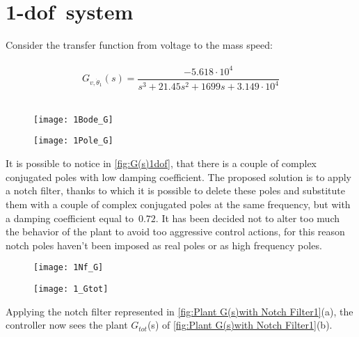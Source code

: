 
\section{\acrshort{1-dof}\ system}
Consider the transfer function from voltage to the mass speed:\\
\\
\[	
G_{v, \dot \theta_1}(s)=
\frac{-5.618 \cdot 10^{4}}{{s^3 + 21.45 s^{2}}+1699 s+3.149 \cdot 10^{4}}
\]
\\

\begin{figure*}[h]
	\centering
	\begin{subfigure}{0.4\columnwidth}
		\texttt{[image: 1Bode\_G]}
	\end{subfigure}
	\begin{subfigure}{0.4\columnwidth}
		\texttt{[image: 1Pole\_G]}
	\end{subfigure}
	\caption{$G_{v, \dot \theta_1}(s)$}
	\label{fig:G(s)1dof}
\end{figure*}

It is possible to notice in \cref{fig:G(s)1dof}, that there is a couple of complex conjugated poles with low damping coefficient. The proposed solution is to apply a notch filter, thanks to which it is possible to delete these poles and substitute them with a couple of complex conjugated poles at the same frequency, but with a damping coefficient equal to~$0.72$. It has been decided not to alter too much the behavior of the plant to avoid too aggressive control actions, for this reason notch poles haven't been imposed as real poles or as high frequency poles.

\begin{figure*}[h]
	\centering
	\begin{subfigure}{0.35\columnwidth}
		\texttt{[image: 1Nf\_G]}
	\end{subfigure}
	\begin{subfigure}{0.35\columnwidth}
		\texttt{[image: 1\_Gtot]}
	\end{subfigure}
	\caption{Plant $G(s)$ with Notch Filter $N_f(s)$: $G_{tot}(s)$}
	\label{fig:Plant G(s)with Notch Filter1}
\end{figure*}


Applying the notch filter represented in \cref{fig:Plant G(s)with Notch Filter1}(a), the controller now sees the plant $G_{tot}$(s) of \cref{fig:Plant G(s)with Notch Filter1}(b).

